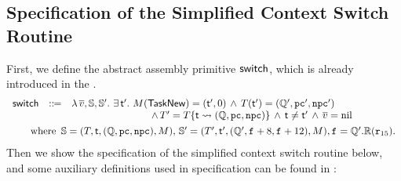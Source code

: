 \subsection{Specification of the Simplified Context Switch Routine}

First, we define the abstract assembly primitive $\mathsf{switch}$, which is 
already introduced in the \Sec{\ref{subsec:High-level Pseudo-SPARCv8 Language}}. 
{
    \small
    $$
    \begin{array}{lcl}
        \primsw & \define & 
        \lambda \, \args{\val}, \hpstate, \hpstate'. \ 
        \exists \, \thrdid'. \ 
        \Mem(\TaskNew) = (\thrdid', 0) \, \land \, 
        \thrdpool(\thrdid') = 
            (\hRstate', \pc', \npc') \\ 
        & & \hspace*{8em} \land \, 
        \thrdpool' = \thrdpool\{ \thrdid \rightsquigarrow 
        (\hRstate, \pc, \npc) \}
        \, \land \, \thrdid \neq \thrdid'
        \, \land \, \args{\val} = \nil \\
        \\[-8pt] 
        \multicolumn{3}{l}
        {
        	\hspace*{1.8em}
            \text{where } \, 
            \hpstate = 
                (\thrdpool, \thrdid, (\hRstate, \pc, \npc), \Mem), \, 
            \hpstate' = 
            (\thrdpool', \thrdid', 
            	(\hRstate', \lab{} + 8, \lab{} + 12), \Mem), \lab{} = \hRstate'.\hRfile(\reg{15}). 
        }
    \end{array}
    $$
}
Then we show the specification of the simplified context switch routine below, and some auxiliary 
definitions used in specification can be found in \Fig{\ref{def:aux-def-spec}}: 
